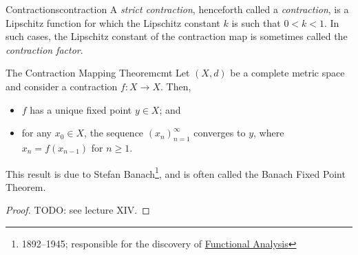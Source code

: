 \documentclass{article}
\newif\ifdraft
\numberwithin{equation}{section}
\numberwithin{figure}{section}
\begin{document}
\begin{definition}{Contractions}{contraction}
    A \emph{strict contraction}, henceforth called a \emph{contraction}, is a
    Lipschitz function for which the Lipschitz constant $ k $ is such that $ 0 <
    k < 1 $. In such cases, the Lipschitz constant of the contraction map is
    sometimes called the \emph{contraction factor}.
\end{definition}
\begin{theorem}{The Contraction Mapping Theorem}{cmt}
    Let $ (X, d) $ be a complete metric space and consider a contraction $ f
    \colon X \to X $. Then,
    \begin{itemize}
        \item $ f $ has a unique fixed point $ y \in X $; and
        \item for any $ x_0 \in X $, the sequence $ \left( x_n
            \right)_{n=1}^\infty $ converges to $ y $, where $ x_n =
            f\left(x_{n-1}\right) $ for $ n \geq 1 $.
    \end{itemize}
    This result is due to Stefan Banach\footnote{1892--1945; responsible for the
    discovery of \href{https://www.york.ac.uk/students/studying/manage/%
    programmes/module-catalogue/module/MAT00107M/latest}{Functional Analysis}},
    and is often called the Banach Fixed Point Theorem.
    \begin{proof}
        TODO: see lecture XIV.
    \end{proof}
\end{theorem}

\clearpage
\ifdraft\else
\fi
\printbibliography[heading=bibintoc,
    title={Recommended Texts \& Further Reading}]
\end{document}
